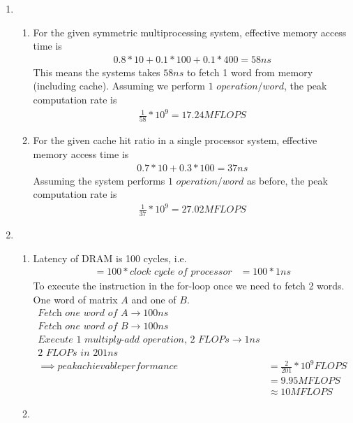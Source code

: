 \documentclass{article}
\begin{document}
\begin{enumerate}[label=\Large\textbf{\arabic*}.]
\item  
\begin{enumerate}[label={\arabic*}.]
	\item 
		For the given symmetric multiprocessing system, effective memory access time is 
		\begin{align*}
			0.8 * 10 + 0.1 * 100 + 0.1 * 400 = 58 ns
		\end{align*}
		This means the systems takes $58ns$ to fetch 1 word from memory (including cache).
		Assuming we perform $1$ $operation/word$, the peak computation rate is
		\begin{align*}
			\frac{1}{58} * 10^9 = 17.24MFLOPS
		\end{align*}
	\item
		For the given cache hit ratio in a single processor system, effective memory access time is
		\begin{align*}
			0.7 * 10 + 0.3 * 100 = 37ns
		\end{align*}
		Assuming the system performs $1$ $operation/word$ as before, the peak computation rate is 
		\begin{align*}
			\frac{1}{37} * 10 ^ 9 = 27.02 MFLOPS
		\end{align*}
\end{enumerate} 



\item
\begin{enumerate}[label={\arabic*}.]
	\item
	Latency of DRAM is 100 cycles, i.e. 
	\begin{align*}
		= 100 * \textit{clock cycle of processor}
		&= 100 * 1ns
	\end{align*}
	To execute the instruction in the for-loop once we need to fetch 2 words. One word of matrix $A$ and one of $B$. 
	\begin{align}
		\textit{Fetch one word of A} \to100ns		
		\\\textit{Fetch one word of B} \to 100ns
		\\\textit{Execute 1 multiply-add operation, 2 FLOPs} \to 1ns
		\\\textit{2 FLOPs in 201ns}
		\\\implies peak achievable performance &= \frac{2}{201} * 10^9 FLOPS
		\\&= 9.95 MFLOPS 
		\\&\approx 10 MFLOPS
	\end{align}
	
	\item
	

\end{enumerate}
\end{enumerate}
\end{document}
